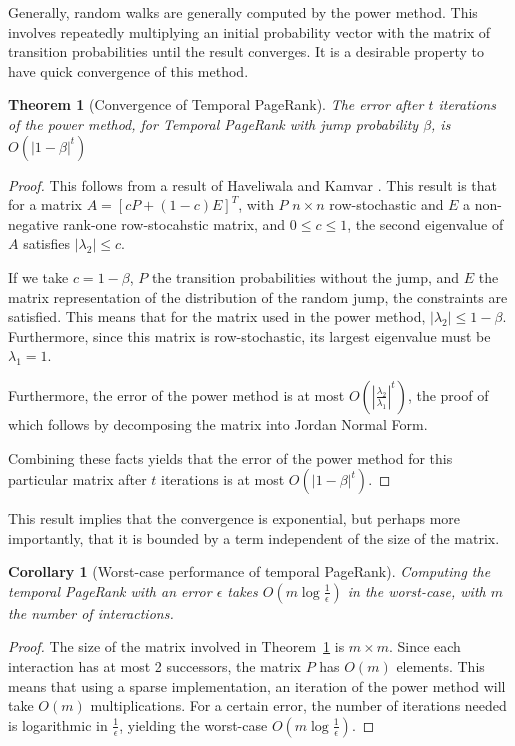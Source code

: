 \documentclass[a4paper,11pt]{book}
\newcommand{\eps}{\epsilon}
\newtheorem{theorem}{Theorem}
\newtheorem*{corollary}{Corollary}
\theoremstyle{definition}
\begin{document}
Generally, random walks are generally computed by the power method. This involves repeatedly
multiplying an initial probability vector with the matrix of transition probabilities until
the result converges. It is a desirable property to have quick convergence of this method.

\begin{theorem}[Convergence of Temporal PageRank]
    The error after $t$ iterations of the power method, for Temporal PageRank with
    jump probability $\beta$, is $O(|1-\beta|^t)$
    \label{thm:conv_tpr}
\end{theorem}

\begin{proof}
    This follows from a result of Haveliwala and Kamvar \cite{haveliwala2003second}. This
    result is that for a matrix $A = [cP + (1-c)E]^T$, with $P$ $n \times n$ row-stochastic
    and $E$ a non-negative rank-one row-stocahstic matrix, and $0 \leq c \leq 1$, the
    second eigenvalue of $A$ satisfies $|\lambda_2| \leq c$. 

    If we take $c=1-\beta$, $P$ the transition probabilities without the jump, and $E$ the
    matrix representation of the distribution of the random jump, the constraints are satisfied.
    This means that for the matrix used in the power method, $|\lambda_2| \leq 1-\beta$.
    Furthermore, since this matrix is row-stochastic, its largest eigenvalue must be $\lambda_1=1$.

    Furthermore, the error of the power method is at most $O\left(\left|\frac{\lambda_2}{\lambda_1}\right|^t\right)$,
    the proof of which follows by decomposing the matrix into Jordan Normal Form.

    Combining these facts yields that the error of the power method for this particular matrix
    after $t$ iterations is at most $O(|1-\beta|^t)$. 
\end{proof}

This result implies that the convergence is exponential, but perhaps more importantly, that it is bounded
by a term independent of the size of the matrix. 

\begin{corollary}[Worst-case performance of temporal PageRank]
    Computing the temporal PageRank with an error $\eps$ takes $O(m\log\frac1\eps)$ in the worst-case,
    with $m$ the number of interactions.
\end{corollary}
\begin{proof}
    The size of the matrix involved in Theorem~\ref{thm:conv_tpr} is $m \times m$. Since each interaction
    has at most 2 successors, the matrix $P$ has $O(m)$ elements. This means that using a sparse implementation,
    an iteration of the power method will take $O(m)$ multiplications. For a certain error, the number of
    iterations needed is logarithmic in $\frac1\eps$, yielding the worst-case $O(m\log\frac1\eps)$.
\end{proof}
\end{document}
